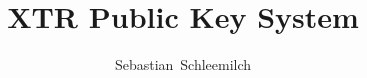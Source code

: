\documentclass[10pt,        %
               a4paper,     %
               journal,     %
               ]{IEEEtran}
\makeatletter
\def\markboth#1#2{\def\leftmark{\@IEEEcompsoconly{\sffamily}\MakeUppercase{\protect#1}}%
\def\rightmark{\@IEEEcompsoconly{\sffamily}\MakeUppercase{\protect#2}}}
\makeatother
\begin{document}
%
\title{XTR Public Key System}
%
%
%

\author{Sebastian~Schleemilch}%

% 
%



\markboth{Hauptseminar Sicherheit in der Informationstechnik, Sommersemester 2015}%
{Sebastian Schleemilch: XTR Public Key System}

% 
\end{document}
